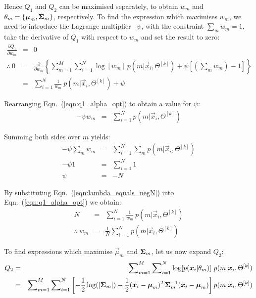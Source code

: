 \noindent
Hence $Q_1$ and $Q_2$ can be maximised separately, to obtain $w_m$ and $\theta_m = \{ {\boldsymbol{\mu}}_m, {\boldsymbol{\Sigma}}_m \}$, respectively.
To find the expression which maximises $w_m$, we need to introduce the Lagrange multiplier~\cite{Duda01} $\psi$,
with the constraint $\sum\nolimits_m w_m = 1$, take the derivative of $Q_1$ with respect to $w_m$ and set the result to zero:
%
\begin{eqnarray}
	\frac{\partial Q_1}{\partial w_m} & = & 0 \\
						\therefore ~ 0  & = & \frac{\partial}{\partial w_m}
											\left\{ \sum\nolimits_{m=1}^{M} \sum\nolimits_{i=1}^{N} \log[ w_m ]  ~ p(m|\Vec{x}_i, \Theta^{[k]})
											 		+ \psi \left[ (\sum\nolimits_m w_m) -1 \right] \right\} \\
									~ & = & \sum\nolimits_{i=1}^{N} \frac{1}{w_m} ~ p(m|\Vec{x}_i, \Theta^{[k]}) + \psi \label{eqn:q1_alpha_opt}
\end{eqnarray}

\noindent
Rearranging Eqn.~(\ref{eqn:q1_alpha_opt}) to obtain a value for $\psi$:
%
\begin{eqnarray}
	-\psi w_m & = & \sum\nolimits_{i=1}^{N} p(m|\Vec{x}_i, \Theta^{[k]})
\end{eqnarray}

\noindent
Summing both sides over $m$ yields:
%
\begin{eqnarray}
	-\psi \sum\nolimits_m w_m & = & \sum\nolimits_{i=1}^{N} \sum\nolimits_m p(m|\Vec{x}_i, \Theta^{[k]}) \\
	-\psi 1 & = & \sum\nolimits_{i=1}^{N} 1 \\
	\psi & =  & -N	\label{eqn:lambda_equals_negN}
\end{eqnarray}

\noindent
By substituting Eqn.~(\ref{eqn:lambda_equals_negN}) into Eqn.~(\ref{eqn:q1_alpha_opt}) we obtain:
%
\begin{eqnarray}
			N & = & \sum\nolimits_{i=1}^{N} \frac{1}{w_m} ~ p(m|\Vec{x}_i, \Theta^{[k]}) \\
	\therefore ~ w_m & = & \frac{1}{N} \sum\nolimits_{i=1}^{N} p(m|\Vec{x}_i, \Theta^{[k]}) 
	\label{eqn:alpha_m_solved}
\end{eqnarray}

\noindent
To find expressions which maximise $\Vec{\mu}_m$ and ${\boldsymbol{\Sigma}}_m$, let us now expand $Q_2$:
%
\begin{eqnarray}
	Q_2 & = &   \sum\nolimits_{m=1}^{M}	\sum\nolimits_{i=1}^{N} \log[  p({\boldsymbol{x}}_i | \theta_m) ] ~ p(m|{\boldsymbol{x}}_i, \Theta^{[k]}) 	\\
	 ~  & = &   \sum\nolimits_{m=1}^{M} \sum\nolimits_{i=1}^{N} \left[
					- \frac{1}{2} \log(|{\boldsymbol{\Sigma}}_m|) - \frac{1}{2} ({\boldsymbol{x}}_i - {\boldsymbol{\mu}}_m)^T {\boldsymbol{\Sigma}}_m^{-1} ({\boldsymbol{x}}_i - {\boldsymbol{\mu}}_m)
					\right] p(m|{\boldsymbol{x}}_i, \Theta^{[k]})  \label{eqn:q2_expanded}
\end{eqnarray}


